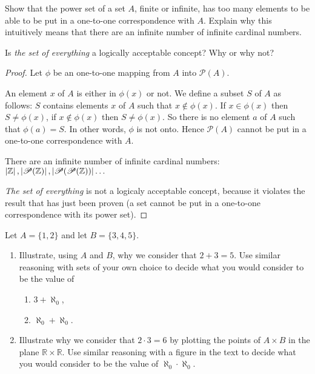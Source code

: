 \begin{exercise}
    Show that the power set of a set $A$, finite or infinite, has too many elements to be able to be put in a one-to-one correspondence with $A$. Explain why this intuitively means that there are an infinite number of infinite cardinal numbers.

    Is \textit{the set of everything} a logically acceptable concept? Why or why not?
\end{exercise}

\begin{proof}
    Let $\phi$ be an one-to-one mapping from $A$ into $\mathscr{P}(A)$.

    An element $x$ of $A$ is either in $\phi(x)$ or not. We define a subset $S$ of $A$ as follows: $S$ contains elements $x$ of $A$ such that $x\notin\phi(x)$. If $x\in\phi(x)$ then $S\ne\phi(x)$, if $x\notin\phi(x)$ then $S\ne\phi(x)$. So there is no element $a$ of $A$ such that $\phi(a) = S$. In other words, $\phi$ is not onto. Hence $\mathscr{P}(A)$ cannot be put in a one-to-one correspondence with $A$.

    There are an infinite number of infinite cardinal numbers: $\left\vert{\mathbb{Z}}\right\vert, \left\vert{\mathscr{P}(\mathbb{Z})}\right\vert, \left\vert{\mathscr{P}(\mathscr{P}(\mathbb{Z}))}\right\vert\ldots$

    \textit{The set of everything} is not a logicaly acceptable concept, because it violates the result that has just been proven (a set cannot be put in a one-to-one correspondence with its power set).
\end{proof}

\begin{exercise}
    Let $A = \{ 1, 2 \}$ and let $B = \{ 3, 4, 5 \}$.
    \begin{enumerate}[label={\textbf{\alph*.}}]
        \item Illustrate, using $A$ and $B$, why we consider that $2 + 3 = 5$. Use similar reasoning with sets of your own choice to decide what you would consider to be the value of
              \begin{enumerate}[label={\roman*.},topsep=0pt,itemsep=0pt]
                  \item $3 + \aleph_{0}$,
                  \item $\aleph_{0} + \aleph_{0}$.
              \end{enumerate}
        \item Illustrate why we consider that $2 \cdot 3 = 6$ by plotting the points of $A \times B$ in the plane $\mathbb{R}\times\mathbb{R}$. Use similar reasoning with a figure in the text to decide what you would consider to be the value of $\aleph_{0}\cdot\aleph_{0}$.
    \end{enumerate}
\end{exercise}

